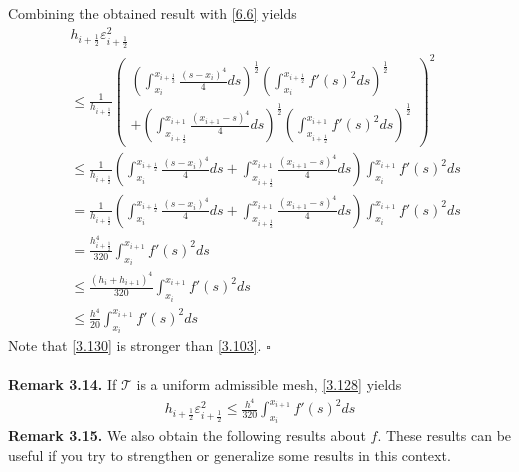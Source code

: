 \documentclass[a4paper]{article}
\numberwithin{equation}{section}
\begin{document}
Combining the obtained result with \eqref{6.6} yields
\begin{align}
&{h_{i + \frac{1}{2}}}\varepsilon _{i + \frac{1}{2}}^2 \\
&\le \frac{1}{{{h_{i + \frac{1}{2}}}}}{\left( \begin{array}{l}
{\left( {\int_{{x_i}}^{{x_{i + \frac{1}{2}}}} {\frac{{{{\left( {s - {x_i}} \right)}^4}}}{4}ds} } \right)^{\frac{1}{2}}}{\left( {\int_{{x_i}}^{{x_{i + \frac{1}{2}}}} {f'{{\left( s \right)}^2}ds} } \right)^{\frac{1}{2}}}\\
 + {\left( {\int_{{x_{i + \frac{1}{2}}}}^{{x_{i + 1}}} {\frac{{{{\left( {{x_{i + 1}} - s} \right)}^4}}}{4}ds} } \right)^{\frac{1}{2}}}{\left( {\int_{{x_{i + \frac{1}{2}}}}^{{x_{i + 1}}} {f'{{\left( s \right)}^2}ds} } \right)^{\frac{1}{2}}}
\end{array} \right)^2}\\
& \le \frac{1}{{{h_{i + \frac{1}{2}}}}}\left( {\int_{{x_i}}^{{x_{i + \frac{1}{2}}}} {\frac{{{{\left( {s - {x_i}} \right)}^4}}}{4}ds}  + \int_{{x_{i + \frac{1}{2}}}}^{{x_{i + 1}}} {\frac{{{{\left( {{x_{i + 1}} - s} \right)}^4}}}{4}ds} } \right)\int_{{x_i}}^{{x_{i + 1}}} {f'{{\left( s \right)}^2}ds} \\
 &= \frac{1}{{{h_{i + \frac{1}{2}}}}}\left( {\int_{{x_i}}^{{x_{i + \frac{1}{2}}}} {\frac{{{{\left( {s - {x_i}} \right)}^4}}}{4}ds}  + \int_{{x_{i + \frac{1}{2}}}}^{{x_{i + 1}}} {\frac{{{{\left( {{x_{i + 1}} - s} \right)}^4}}}{4}ds} } \right)\int_{{x_i}}^{{x_{i + 1}}} {f'{{\left( s \right)}^2}ds} \\
& = \frac{{h_{i + \frac{1}{2}}^4}}{{320}}\int_{{x_i}}^{{x_{i + 1}}} {f'{{\left( s \right)}^2}ds}\label{3.128} \\
 &\le \frac{{{{\left( {{h_i} + {h_{i + 1}}} \right)}^4}}}{{320}}\int_{{x_i}}^{{x_{i + 1}}} {f'{{\left( s \right)}^2}ds} \\
& \le \frac{{{h^4}}}{{20}}\int_{{x_i}}^{{x_{i + 1}}} {f'{{\left( s \right)}^2}ds} \label{3.130}
\end{align}
Note that \eqref{3.130} is stronger than \eqref{3.103}. \hfill $\square$\\
\\
\textbf{Remark 3.14.} If $\mathcal{T}$ is a uniform admissible mesh, \eqref{3.128} yields
\begin{align}
{h_{i + \frac{1}{2}}}\varepsilon _{i + \frac{1}{2}}^2 \le \frac{{{h^4}}}{{320}}\int_{{x_i}}^{{x_{i + 1}}} {f'{{\left( s \right)}^2}ds} 
\end{align}
\textbf{Remark 3.15.} We also obtain the following results about $f$. These results can be useful if you try to strengthen or generalize some results in this context.
\end{document}
